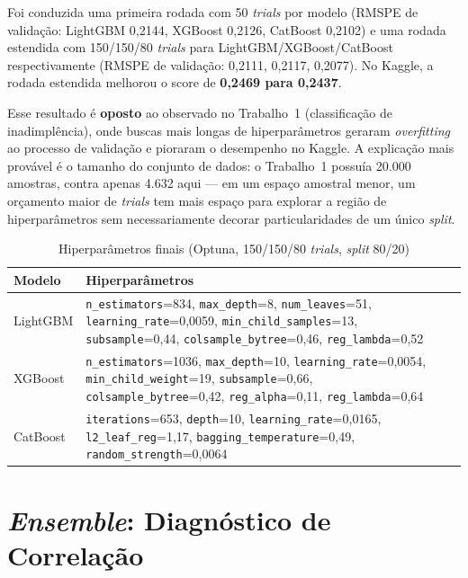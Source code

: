 \documentclass[12pt, a4paper]{article}
\newcommand{\code}[1]{\texttt{#1}}
\begin{document}
Foi conduzida uma primeira rodada com 50 \textit{trials} por modelo (RMSPE de validação: LightGBM 0,2144, XGBoost 0,2126, CatBoost 0,2102) e uma rodada estendida com 150/150/80 \textit{trials} para LightGBM/XGBoost/CatBoost respectivamente (RMSPE de validação: 0,2111, 0,2117, 0,2077). No Kaggle, a rodada estendida melhorou o score de \textbf{0,2469 para 0,2437}.

Esse resultado é \textbf{oposto} ao observado no Trabalho~1 (classificação de inadimplência), onde buscas mais longas de hiperparâmetros geraram \textit{overfitting} ao processo de validação e pioraram o desempenho no Kaggle. A explicação mais provável é o tamanho do conjunto de dados: o Trabalho~1 possuía 20.000 amostras, contra apenas 4.632 aqui --- em um espaço amostral menor, um orçamento maior de \textit{trials} tem mais espaço para explorar a região de hiperparâmetros sem necessariamente decorar particularidades de um único \textit{split}.

\begin{table}[H]
  \centering
  \caption{Hiperparâmetros finais (Optuna, 150/150/80 \textit{trials}, \textit{split} 80/20)}
  \label{tab:hyperparams}
  \small{}
  \begin{tabular}{lp{10.5cm}}
    \toprule
    \rowcolor{headerblue}
    \color{white}\textbf{Modelo} & \color{white}\textbf{Hiperparâmetros} \\
    \midrule
    LightGBM & \code{n\_estimators}=834, \code{max\_depth}=8, \code{num\_leaves}=51, \code{learning\_rate}=0,0059, \code{min\_child\_samples}=13, \code{subsample}=0,44, \code{colsample\_bytree}=0,46, \code{reg\_lambda}=0,52 \\
    XGBoost  & \code{n\_estimators}=1036, \code{max\_depth}=10, \code{learning\_rate}=0,0054, \code{min\_child\_weight}=19, \code{subsample}=0,66, \code{colsample\_bytree}=0,42, \code{reg\_alpha}=0,11, \code{reg\_lambda}=0,64 \\
    CatBoost & \code{iterations}=653, \code{depth}=10, \code{learning\_rate}=0,0165, \code{l2\_leaf\_reg}=1,17, \code{bagging\_temperature}=0,49, \code{random\_strength}=0,0064 \\
    \bottomrule
  \end{tabular}
\end{table}

\section{\textit{Ensemble}: Diagnóstico de Correlação}
\label{sec:ensemble}
\end{document}
